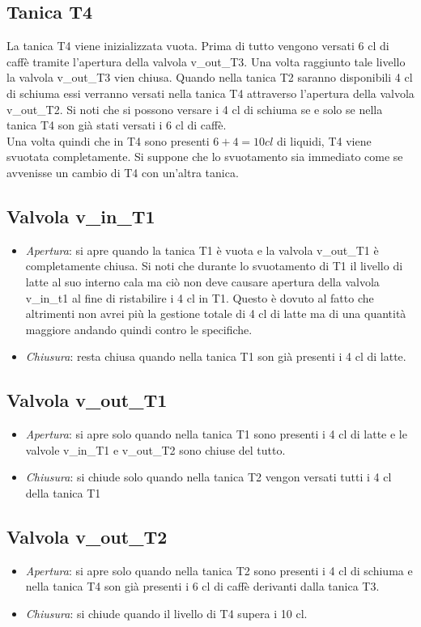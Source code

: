 \documentclass[12pt]{article}
\begin{document}
\subsection{Tanica T4}
La tanica T4 viene inizializzata vuota. Prima di tutto vengono versati 6 cl di caffè tramite l'apertura della valvola v\_out\_T3. Una volta raggiunto tale livello la valvola v\_out\_T3 vien chiusa. Quando nella tanica T2 saranno disponibili 4 cl di schiuma essi verranno versati nella tanica T4 attraverso l'apertura della valvola v\_out\_T2. Si noti che si possono versare i 4 cl di schiuma se e solo se nella tanica T4 son già stati versati i 6 cl di caffè.\\ Una volta quindi che in T4 sono presenti $6+4=10 cl$ di liquidi, T4 viene svuotata completamente. Si suppone che lo svuotamento sia immediato come se avvenisse un cambio di T4 con un'altra tanica.

\subsection{Valvola v\_in\_T1}
\begin{itemize}
	\item \textit{Apertura}: si apre quando la tanica T1 è vuota e la valvola v\_out\_T1 è completamente chiusa. Si noti che durante lo svuotamento di T1 il livello di latte al suo interno cala ma ciò non deve causare apertura della valvola v\_in\_t1 al fine di ristabilire i 4 cl in T1. Questo è dovuto al fatto che altrimenti non avrei più la gestione totale di 4 cl di latte ma di una quantità maggiore andando quindi contro le specifiche.
	\item \textit{Chiusura}: resta chiusa quando nella tanica T1 son già presenti i 4 cl di latte. 
\end{itemize}

\subsection{Valvola v\_out\_T1}
\begin{itemize}
	\item \textit{Apertura}: si apre solo quando nella tanica T1 sono presenti i 4 cl di latte e le valvole v\_in\_T1 e v\_out\_T2 sono chiuse del tutto.
	\item \textit{Chiusura}: si chiude solo quando nella tanica T2 vengon versati tutti i 4 cl della tanica T1 
\end{itemize}
	
\subsection{Valvola v\_out\_T2}
\begin{itemize}
	\item \textit{Apertura}: si apre solo quando nella tanica T2 sono presenti i 4 cl di schiuma e nella tanica T4 son già presenti i 6 cl di caffè derivanti dalla tanica T3.
	\item \textit{Chiusura}: si chiude quando il livello di T4 supera i 10 cl.
\end{itemize}
	
\end{document}
